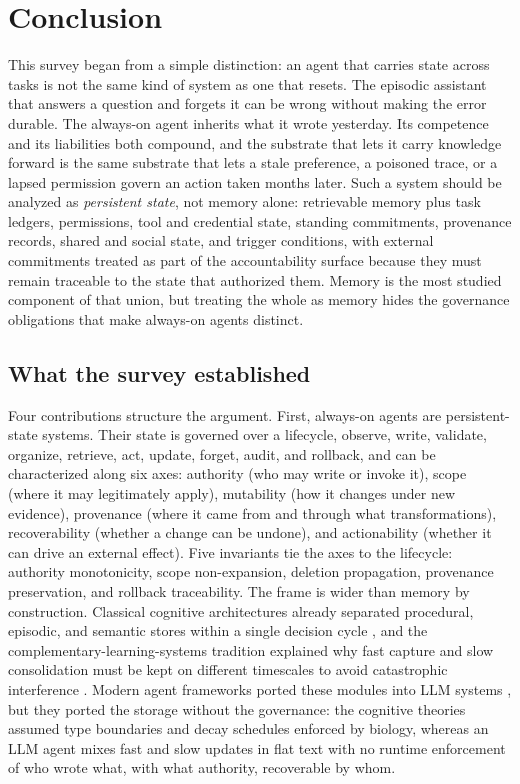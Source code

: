 \section{Conclusion}\label{sec:conclusion}

This survey began from a simple distinction: an agent that carries state across tasks is not the same kind of system as one that resets. The episodic assistant that answers a question and forgets it can be wrong without making the error durable. The always-on agent inherits what it wrote yesterday. Its competence and its liabilities both compound, and the substrate that lets it carry knowledge forward is the same substrate that lets a stale preference, a poisoned trace, or a lapsed permission govern an action taken months later. Such a system should be analyzed as \emph{persistent state}, not memory alone: retrievable memory plus task ledgers, permissions, tool and credential state, standing commitments, provenance records, shared and social state, and trigger conditions, with external commitments treated as part of the accountability surface because they must remain traceable to the state that authorized them. Memory is the most studied component of that union, but treating the whole as memory hides the governance obligations that make always-on agents distinct.

\subsection{What the survey established}

Four contributions structure the argument. First, always-on agents are persistent-state systems. Their state is governed over a lifecycle, observe, write, validate, organize, retrieve, act, update, forget, audit, and rollback, and can be characterized along six axes: authority (who may write or invoke it), scope (where it may legitimately apply), mutability (how it changes under new evidence), provenance (where it came from and through what transformations), recoverability (whether a change can be undone), and actionability (whether it can drive an external effect). Five invariants tie the axes to the lifecycle: authority monotonicity, scope non-expansion, deletion propagation, provenance preservation, and rollback traceability. The frame is wider than memory by construction. Classical cognitive architectures already separated procedural, episodic, and semantic stores within a single decision cycle \citep{laird2012soar, anderson2004actr, tulving1972episodic}, and the complementary-learning-systems tradition explained why fast capture and slow consolidation must be kept on different timescales to avoid catastrophic interference \citep{mcclelland1995complementary}. Modern agent frameworks ported these modules into LLM systems \citep{sumers2024cognitivearchitectureslanguageagents}, but they ported the storage without the governance: the cognitive theories assumed type boundaries and decay schedules enforced by biology, whereas an LLM agent mixes fast and slow updates in flat text with no runtime enforcement of who wrote what, with what authority, recoverable by whom.

